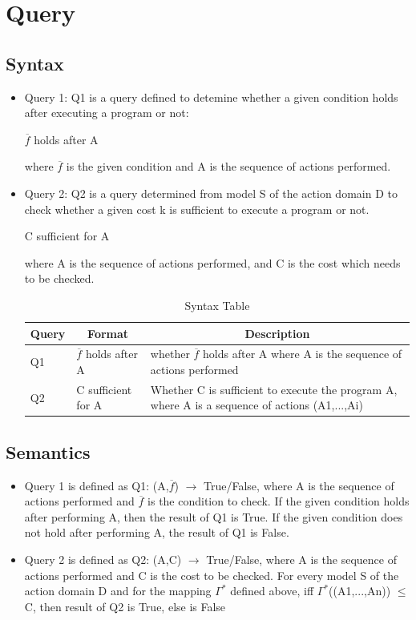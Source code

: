 \documentclass[11pt]{article}
\begin{document}
\section{Query}
\subsection{Syntax}
\begin{itemize}
\item{Query 1: Q1 is a query defined to detemine whether a given condition holds after executing a program or not:
\begin{center}
	$\overline{f}$ holds after A
\end{center}
where $\overline{f}$ is the given condition and A is the sequence of actions performed.
}
\item{Query 2: Q2 is a query determined from model S of the action domain D to check whether a given cost k is sufficient to execute a program or not.
\begin{center}
	C sufficient for A
\end{center}
where A is the sequence of actions performed, and C is the cost which needs to be checked.
}

\begin{table}[H]
	\centering
	\begin{tabular}{|p{2cm}|p{4cm}|p{7cm}|}
		\hline
		\multicolumn{1}{|c|}{\textbf{Query}} & \multicolumn{1}{c|}{\textbf{Format}} & \multicolumn{1}{c|}{\textbf{Description}} \\
		\hline
		Q1 & $\overline{f}$ holds after A & whether $\overline{f}$ holds after A where A is the sequence of actions performed\\
		\hline
		Q2 & C sufficient for A & Whether C is sufficient to execute the program A, where A is a sequence of actions (A1,...,Ai)\\
		\hline
	\end{tabular}
	\caption{Syntax Table}
	\label{tab:table01}
\end{table}
\end{itemize}
\subsection{Semantics}
\begin{itemize}
	\item{Query 1 is defined as Q1: (A,$\overline{f}$) $\rightarrow$ True/False, where A is the sequence of actions performed and $\overline{f}$} is the condition to check. If the given condition holds after performing A, then the result of Q1 is True. If the given condition does not hold after performing A, the result of Q1 is False.
	\item{Query 2 is defined as Q2: (A,C) $\rightarrow$ True/False, where A is the sequence of actions performed and C is the cost to be checked. For every model S of the action domain D and for the mapping $\Gamma^{\ast}$ defined above, iff $\Gamma^{\ast}$((A1,...,An)) $\leq$ C, then result of Q2 is True, else is False}
\end{itemize}
\end{document}
